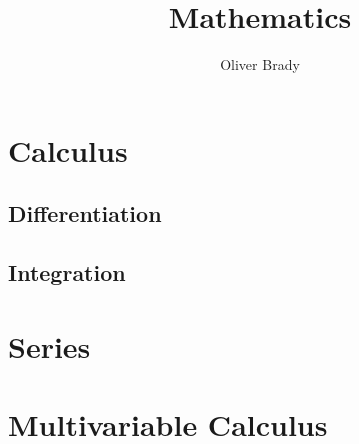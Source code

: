 \documentclass[]{article}
\title{Mathematics}
\author{Oliver Brady}
\begin{document}
\maketitle
\tableofcontents

\section{Calculus}
\subsection{Differentiation}
\subsection{Integration}
\section{Series}
\section{Multivariable Calculus}
\end{document}
